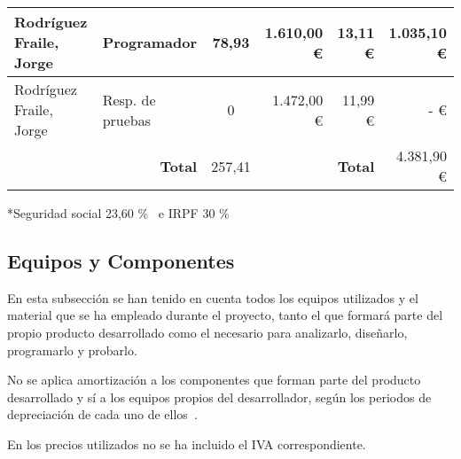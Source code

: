 \begin{table}[H]
{\begin{tabular}{ll|c|rr|r|}
			\multicolumn{1}{|l|}{Rodríguez Fraile, Jorge}                             & Programador                                                 & 78,93                                   & \multicolumn{1}{r|}{1.610,00 €}                              & 13,11 €                                                                              & 1.035,10 €                                                                           \\ \hline
			\multicolumn{1}{|l|}{Rodríguez Fraile, Jorge}                             & Resp. de pruebas                                            & 0                                       & \multicolumn{1}{r|}{1.472,00 €}                              & 11,99 €                                                                              & -   €                                                                                \\ \hline
			                                                                          & \multicolumn{1}{r|}{\textbf{Total}}                         & 257,41                                  & \multicolumn{1}{l}{}                                         & \textbf{Total}                                                                       & 4.381,90 €                                                                           \\ \cline{3-3} \cline{6-6}
		\end{tabular}%
	}
\end{table}

*Seguridad social 23,60 \%~\cite{noauthor_seguridad_nodate} e IRPF 30 \%~\cite{trecet_irpf_nodate}

\subsection{Equipos y Componentes}\label{subsec:equipos-y-componentes}
En esta subsección se han tenido en cuenta todos los equipos utilizados y el material que se ha empleado durante el proyecto, tanto el que formará parte del propio producto desarrollado como el necesario para analizarlo, diseñarlo, programarlo y probarlo.

No se aplica amortización a los componentes que forman parte del producto desarrollado y sí a los equipos propios del desarrollador, según los periodos de depreciación de cada uno de ellos~\cite{thiebaud_-muller_service_2018}.

En los precios utilizados no se ha incluido el IVA correspondiente.

